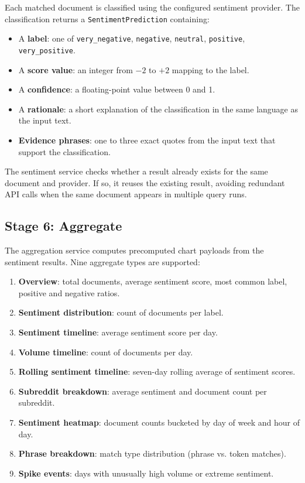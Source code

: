 Each matched document is classified using the configured sentiment provider. The classification returns a \texttt{SentimentPrediction} containing:

\begin{itemize}
    \item A \textbf{label}: one of \texttt{very\_negative}, \texttt{negative}, \texttt{neutral}, \texttt{positive}, \texttt{very\_positive}.
    \item A \textbf{score value}: an integer from $-2$ to $+2$ mapping to the label.
    \item A \textbf{confidence}: a floating-point value between 0 and 1.
    \item A \textbf{rationale}: a short explanation of the classification in the same language as the input text.
    \item \textbf{Evidence phrases}: one to three exact quotes from the input text that support the classification.
\end{itemize}

The sentiment service checks whether a result already exists for the same document and provider. If so, it reuses the existing result, avoiding redundant API calls when the same document appears in multiple query runs.

\subsection{Stage 6: Aggregate}

The aggregation service computes precomputed chart payloads from the sentiment results. Nine aggregate types are supported:

\begin{enumerate}
    \item \textbf{Overview}: total documents, average sentiment score, most common label, positive and negative ratios.
    \item \textbf{Sentiment distribution}: count of documents per label.
    \item \textbf{Sentiment timeline}: average sentiment score per day.
    \item \textbf{Volume timeline}: count of documents per day.
    \item \textbf{Rolling sentiment timeline}: seven-day rolling average of sen\-ti\-ment scores.
    \item \textbf{Subreddit breakdown}: average sentiment and document count per subreddit.
    \item \textbf{Sentiment heatmap}: document counts bucketed by day of week and hour of day.
    \item \textbf{Phrase breakdown}: match type distribution (phrase vs. token matches).
    \item \textbf{Spike events}: days with unusually high volume or extreme sentiment.
\end{enumerate}

